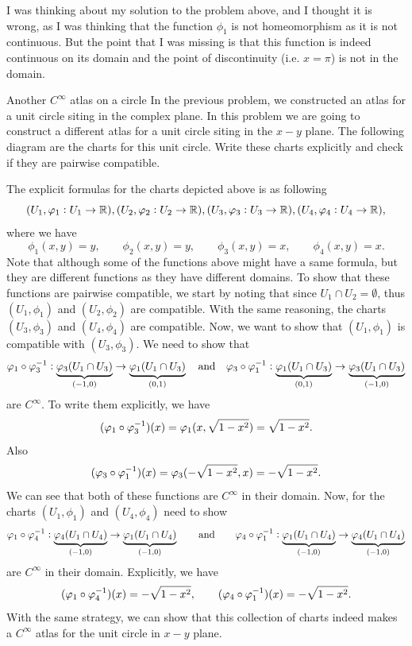 \begin{observation}
	I was thinking about my solution to the problem above, and I thought it is wrong, as I was thinking that the function $ \phi_1 $ is not homeomorphism as it is not continuous. But the point that I was missing is that this function is indeed continuous on its domain and the point of discontinuity (i.e. $ x = \pi $) is not in the domain. 
\end{observation}

\begin{problem}{Another $ C^\infty $ atlas on a circle}
	\label{problem:S^1Charts}
	In the previous problem, we constructed an atlas for a unit circle siting in the complex plane. In this problem we are going to construct a different atlas for a unit circle siting in the $ x-y $ plane. The following diagram are the charts for this unit circle. Write these charts explicitly and check if they are pairwise compatible.
	
\end{problem}
\begin{solution}
	The explicit formulas for the charts depicted above is as following
	\[ (U_1, \varphi_1:U_1\to \mathbb{R}),(U_2, \varphi_2:U_2\to \mathbb{R}), (U_3, \varphi_3:U_3\to \mathbb{R}),(U_4, \varphi_4:U_4\to \mathbb{R}), \]
	where we have
	\[ \phi_1(x,y) = y,\qquad  \phi_2(x,y) = y, \qquad \phi_3(x,y) = x, \qquad \phi_4(x,y) = x. \]
	Note that although some of the functions above might have a same formula, but they are different functions as they have different domains. To show that these functions are pairwise compatible, we start by noting that since $ U_1 \cap U_2 = \emptyset $, thus $ (U_1,\phi_1) $ and $ (U_2,\phi_2) $ are compatible. With the same reasoning, the charts $ (U_3,\phi_3) $ and $ (U_4,\phi_4) $ are compatible. Now, we want to show that $ (U_1,\phi_1) $ is compatible with $ (U_3,\phi_3) $. We need to show that 
	\[ \varphi_1 \circ \varphi_3^{-1}: \underbrace{\varphi_3(U_1\cap U_3)}_{(-1,0)} \to \underbrace{\varphi_1(U_1\cap U_3)}_{(0,1)}\quad \text{and} \quad \varphi_3\circ \varphi_1^{-1}:\underbrace{\varphi_1(U_1\cap U_3)}_{(0,1)} \to \underbrace{\varphi_3(U_1\cap  U_3)}_{(-1,0)} \]
	are $ C^\infty $. To write them explicitly, we have
	\[ (\varphi_1 \circ \varphi_3^{-1})(x) = \varphi_1(x,\sqrt{1-x^2}) = \sqrt{1-x^2}.  \]
	Also
	\[ (\varphi_3 \circ \varphi_1^{-1})(x) = \varphi_3(-\sqrt{1-x^2},x) = -\sqrt{1-x^2}. \]
	We can see that both of these functions are $ C^\infty $ in their domain. Now, for the charts $ (U_1, \phi_1) $ and $ (U_4,\phi_4) $ need to show
	\[ \varphi_1 \circ \varphi_4^{-1}:\underbrace{ \varphi_4(U_1\cap U_4)}_{(-1,0)} \to \underbrace{\varphi_1(U_1\cap U_4)}_{(-1,0)} \qquad \text{and} \qquad \varphi_4\circ \varphi_1^{-1}: \underbrace{\varphi_1(U_1\cap U_4)}_{(-1,0)} \to  \underbrace{\varphi_4(U_1\cap U_4)}_{(-1,0)} \]
	are $ C^\infty $ in their domain. Explicitly, we have
	\[ (\varphi_1 \circ \varphi_4^{-1})(x) = -\sqrt{1 -x^2}, \qquad (\varphi_4\circ \varphi_1^{-1})(x) = -\sqrt{1-x^2}.\]
	With the same strategy, we can show that this collection of charts indeed makes a $ C^\infty $ atlas for the unit circle in $ x-y $ plane.
\end{solution}


